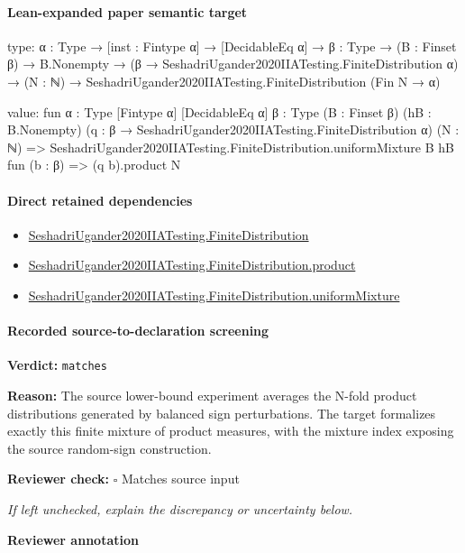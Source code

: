 \documentclass[10pt]{article}
\newcommand{\reviewerbox}{%
  \par\noindent\fbox{\parbox{0.96\linewidth}{\rule{0pt}{0.38in}}}\par
}
\newcommand{\reviewmatch}[1]{%
  \par\noindent\textbf{Reviewer check:} $\square$\; #1\par
  \noindent\emph{If left unchecked, explain the discrepancy or uncertainty below.}\par
}
\begin{document}
\paragraph{Lean-expanded paper semantic target}
\begin{ReviewVerbatim}
type:
{α : Type} →
  [inst : Fintype α] →
    [DecidableEq α] →
      {β : Type} →
        (B : Finset β) →
          B.Nonempty →
            (β → SeshadriUgander2020IIATesting.FiniteDistribution α) →
              (N : ℕ) → SeshadriUgander2020IIATesting.FiniteDistribution (Fin N → α)

value:
fun {α : Type} [Fintype α] [DecidableEq α] {β : Type} (B : Finset β) (hB : B.Nonempty)
    (q : β → SeshadriUgander2020IIATesting.FiniteDistribution α) (N : ℕ) =>
  SeshadriUgander2020IIATesting.FiniteDistribution.uniformMixture B hB fun (b : β) => (q b).product N
\end{ReviewVerbatim}

\paragraph{Direct retained dependencies}
\begin{itemize}\raggedright
\item \hyperlink{governing-declaration-1f578dbb9f9dd733}{Seshadri\allowbreak{}Ugander2020\allowbreak{}IIA\allowbreak{}Testing.\allowbreak{}Finite\allowbreak{}Distribution}
\item \hyperlink{governing-declaration-5fac9c490551d2cc}{Seshadri\allowbreak{}Ugander2020\allowbreak{}IIA\allowbreak{}Testing.\allowbreak{}Finite\allowbreak{}Distribution.\allowbreak{}product}
\item \hyperlink{governing-declaration-45f0f90e5cb494f8}{Seshadri\allowbreak{}Ugander2020\allowbreak{}IIA\allowbreak{}Testing.\allowbreak{}Finite\allowbreak{}Distribution.\allowbreak{}uniform\allowbreak{}Mixture}
\end{itemize}
\paragraph{Recorded source-to-declaration screening}
\textbf{Verdict:} \texttt{matches}
\\
{\raggedright
\textbf{Reason:} The source lower-\allowbreak{}bound experiment averages the N-\allowbreak{}fold product distributions generated by balanced sign perturbations.\allowbreak{} The target formalizes exactly this finite mixture of product measures, with the mixture index exposing the source random-\allowbreak{}sign construction.\allowbreak{}
\par}
\reviewmatch{Matches source input}
\noindent\textbf{Reviewer annotation}\par
\reviewerbox
\end{document}
